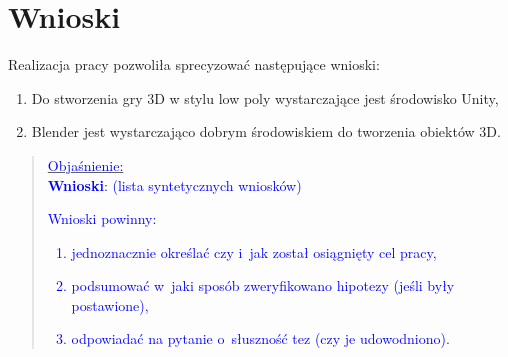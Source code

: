 \newpage
\chapter{Wnioski}
Realizacja pracy pozwoliła sprecyzować następujące wnioski:
\begin{enumerate}
  \item Do stworzenia gry 3D w stylu low poly wystarczające jest środowisko Unity,
  \item Blender jest wystarczająco dobrym środowiskiem do tworzenia obiektów 3D.
\end{enumerate}



\begin{quote}
\scriptsize{
\underline{\textcolor{blue}{Objaśnienie:}}\\[1mm]
\textcolor{blue}{{\textbf{Wnioski}:} (lista syntetycznych wniosków)}\\[1mm]
\textcolor{blue}{
Wnioski powinny:
\begin{enumerate}
\item jednoznacznie określać czy i~jak został osiągnięty cel pracy,
\item podsumować w~jaki sposób zweryfikowano hipotezy (jeśli były postawione),
\item odpowiadać na pytanie o~słuszność tez (czy je udowodniono).
\end{enumerate}
}}
\end{quote} 
